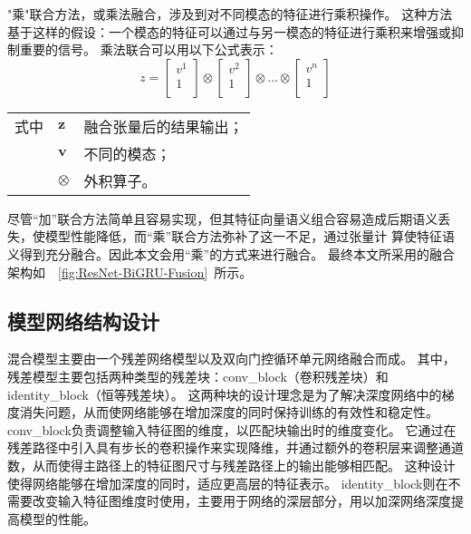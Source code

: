   "乘"联合方法，或乘法融合，涉及到对不同模态的特征进行乘积操作。
  这种方法基于这样的假设：一个模态的特征可以通过与另一模态的特征进行乘积来增强或抑制重要的信号。
  乘法联合可以用以下公式表示：
\begin{equation}
  z = \begin{bmatrix}v^1 \\1\\\end{bmatrix} \otimes \begin{bmatrix}v^2 \\1\\\end{bmatrix} \otimes \dots \otimes \begin{bmatrix}v^n \\1\\\end{bmatrix}
\end{equation}  
\begin{flushleft}
  \renewcommand\arraystretch{1.25}
  \begin{tabularx}{\textwidth}{@{}>{\normalsize\rm}l@{\quad}>{\normalsize\rm}l@{——}>{\normalsize\rm}X@{}}
  式中& $\symbf{z}$ &融合张量后的结果输出；\\
  &  $\symbf{v}$&不同的模态；\\
  &  $\symbf{\otimes}$ &外积算子。\\
   \end{tabularx}\vspace{.5ex}%
\end{flushleft}



尽管“加”联合方法简单且容易实现，但其特征向量语义组合容易造成后期语义丢失，使模型性能降低，而“乘”联合方法弥补了这一不足，通过张量计
算使特征语义得到充分融合\cite{hejunandzhangcaiqing}。因此本文会用“乘”的方式来进行融合。
最终本文所采用的融合架构如~~\ref{fig:ResNet-BiGRU-Fusion}~所示。

\subsection{模型网络结构设计}
混合模型主要由一个残差网络模型以及双向门控循环单元网络融合而成。
其中，残差模型主要包括两种类型的残差块：conv\_block（卷积残差块）和identity\_block（恒等残差块）。
这两种块的设计理念是为了解决深度网络中的梯度消失问题，从而使网络能够在增加深度的同时保持训练的有效性和稳定性。
conv\_block负责调整输入特征图的维度，以匹配块输出时的维度变化。
它通过在残差路径中引入具有步长的卷积操作来实现降维，并通过额外的卷积层来调整通道数，从而使得主路径上的特征图尺寸与残差路径上的输出能够相匹配。
这种设计使得网络能够在增加深度的同时，适应更高层的特征表示。
identity\_block则在不需要改变输入特征图维度时使用，主要用于网络的深层部分，用以加深网络深度提高模型的性能。\par

